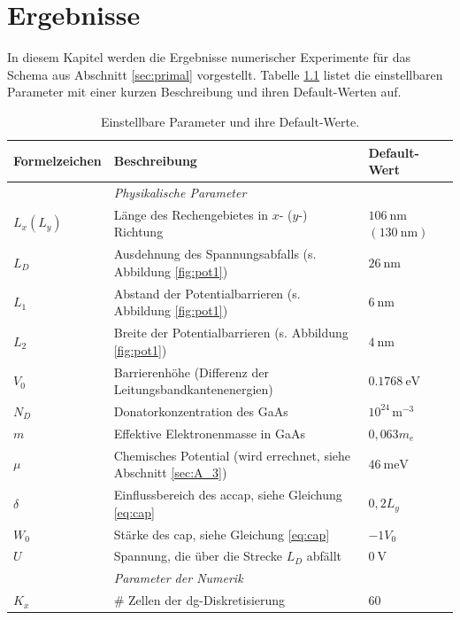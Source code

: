 \chapter{Ergebnisse}
In diesem Kapitel werden die Ergebnisse numerischer Experimente für das Schema aus Abschnitt \ref{sec:primal} vorgestellt. Tabelle \ref{tab:parameter} listet die einstellbaren Parameter mit einer kurzen Beschreibung und ihren Default-Werten auf.
\begin{table}
  \centering
  \caption{Einstellbare Parameter und ihre Default-Werte.}
  \label{tab:parameter}
  \scriptsize
  \begin{tabular}{
    l
    l
    l
  }
    \toprule
    {Formelzeichen} & Beschreibung & Default-Wert \\
    \midrule
       & \emph{Physikalische Parameter} & \\
    $L_x (L_y)$ &Länge des Rechengebietes in $x$- ($y$-) Richtung & $\SI{106}{\nano\meter}$ $(\SI{130}{\nano\meter})$ \\
    $L_D$ & Ausdehnung des Spannungsabfalls (s. Abbildung \ref{fig:pot1}) & $\SI{26}{\nano\meter}$\\
    $L_1$ & Abstand der Potentialbarrieren (s. Abbildung \ref{fig:pot1}) &$\SI{6}{\nano\meter}$ \\
    $L_2$ & Breite der Potentialbarrieren  (s. Abbildung \ref{fig:pot1}) &$\SI{4}{\nano\meter}$ \\
    $V_0$ & Barrierenhöhe (Differenz der Leitungsbandkantenenergien) &$\SI{0.1768}{\electronvolt}$ \\
    $N_D$ & Donatorkonzentration des GaAs & $10^{24}\,\text{m}^{-3}$ \\
    $m$ & Effektive Elektronenmasse in GaAs & $0,063 m_e$ \\
    $\mu$   & Chemisches Potential (wird errechnet, siehe Abschnitt \ref{sec:A_3}) & $\SI{46}{\milli\electronvolt}$ \\
    $\delta$ & Einflussbereich des ac{cap}, siehe Gleichung \eqref{eq:cap} & $0,2 L_y$\\
    $W_0$ & Stärke des \ac{cap}, siehe Gleichung \eqref{eq:cap} &$-1V_0$ \\
    $U$   &Spannung, die über die Strecke $L_D$ abfällt & $\SI{0}{\volt}$ \\
    \midrule
     & \emph{Parameter der Numerik} & \\
    $K_x$ & \# Zellen der \ac{dg}-Diskretisierung & 60 \\

\end{tabular}
\end{table}
